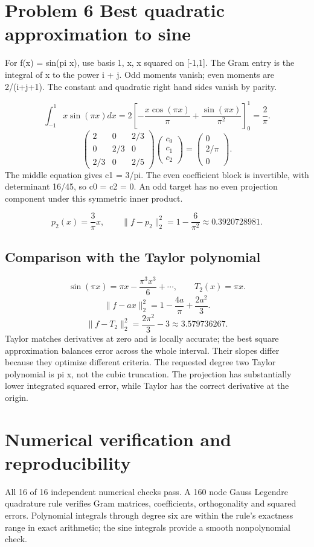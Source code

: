 \documentclass[a4paper,11pt]{article}
\begin{document}
\clearpage
\section*{Problem 6 Best quadratic approximation to sine}
For f(x) = sin(pi x), use basis 1, x, x squared on [-1,1]. The Gram entry is the integral of x to the power i + j. Odd moments vanish; even moments are 2/(i+j+1). The constant and quadratic right hand sides vanish by parity.

\[\int_{-1}^1x\sin(\pi x)dx=2\left[-\frac{x\cos(\pi x)}\pi+\frac{\sin(\pi x)}{\pi^2}\right]_0^1=\frac2\pi.\]
\[\begin{pmatrix}2&0&2/3\\0&2/3&0\\2/3&0&2/5\end{pmatrix}\begin{pmatrix}c_0\\c_1\\c_2\end{pmatrix}=\begin{pmatrix}0\\2/\pi\\0\end{pmatrix}.\]
The middle equation gives c1 = 3/pi. The even coefficient block is invertible, with determinant 16/45, so c0 = c2 = 0. An odd target has no even projection component under this symmetric inner product.

\[p_2(x)=\frac3\pi x,\qquad \|f-p_2\|_2^2=1-\frac6{\pi^2}\approx0.3920728981.\]
\subsection*{Comparison with the Taylor polynomial}
\[\sin(\pi x)=\pi x-\frac{\pi^3x^3}{6}+\cdots,\qquad T_2(x)=\pi x.\]
\[\|f-ax\|_2^2=1-\frac{4a}{\pi}+\frac{2a^2}{3}.\]
\[\|f-T_2\|_2^2=\frac{2\pi^2}{3}-3\approx3.579736267.\]
Taylor matches derivatives at zero and is locally accurate; the best square approximation balances error across the whole interval. Their slopes differ because they optimize different criteria. The requested degree two Taylor polynomial is pi x, not the cubic truncation. The projection has substantially lower integrated squared error, while Taylor has the correct derivative at the origin.

\clearpage
\section*{Numerical verification and reproducibility}
All 16 of 16 independent numerical checks pass. A 160 node Gauss Legendre quadrature rule verifies Gram matrices, coefficients, orthogonality and squared errors. Polynomial integrals through degree six are within the rule's exactness range in exact arithmetic; the sine integrals provide a smooth nonpolynomial check.
\end{document}
